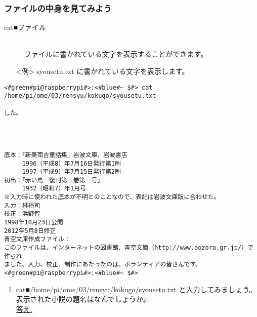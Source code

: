 \subsubsection{ファイルの中身を見てみよう}
\begin{description}
\item[cat■ファイル]\mbox{}\\
ファイルに書かれている文字を表示することができます。
\end{description}
\begin{itemize}
\item[<例>]syousetu.txt に書かれている文字を表示します。
\end{itemize}
\begin{lstlisting}[caption=catの例, label=cat]
<#green#pi@raspberrypi#>:<#blue#~ $#> cat /home/pi/ome/03/rensyu/kokugo/syousetu.txt

した。




底本：「新美南吉童話集」岩波文庫、岩波書店
　　　1996（平成8）年7月16日発行第1刷
　　　1997（平成9）年7月15日発行第2刷
初出：「赤い鳥　復刊第三巻第一号」
　　　1932（昭和7）年1月号
※入力時に使われた底本が不明とのことなので、表記は岩波文庫版に合わせた。
入力：林裕司
校正：浜野智
1998年10月23日公開
2012年5月8日修正
青空文庫作成ファイル：
このファイルは、インターネットの図書館、青空文庫（http://www.aozora.gr.jp/）で作られ
ました。入力、校正、制作にあたったのは、ボランティアの皆さんです。<#green#pi@raspberrypi#>:<#blue#~ $#>
\end{lstlisting}

\begin{tcolorbox}[title=\useOmetoi]
\begin{enumerate}
\item cat■/home/pi/ome/03/rensyu/kokugo/syousetu.txt と入力してみましょう。\\表示された小説の題名はなんでしょうか。\\
\underline{答え.\hspace{0.8\linewidth}}
\end{enumerate}
\end{tcolorbox}